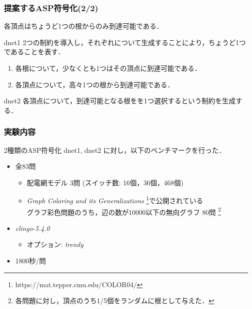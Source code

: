 \documentclass[dvipdfmx,11pt]{beamer}
\begin{document}
\begin{frame}\frametitle{提案するASP符号化(2/2)}
 \begin{exampleblock}{}
  \centering
  各頂点は\alert{ちょうど1つ}の根からのみ到達可能である．
 \end{exampleblock}

 \begin{block}{dnet1}
  2つの制約を導入し，それぞれについて生成することにより，ちょうど1つであることを表す．
   \begin{enumerate}
   \item 各根について，\alert{少なくとも1つ}はその頂点に到達可能である．
   \item 各頂点について，\alert{高々1つ}の根から到達可能である．
   \end{enumerate}
 \end{block}

 \begin{block}{dnet2}
  各頂点について，到達可能となる根をを\alert{1つ選択する}という制約を生成する．
 \end{block}

\end{frame}

\begin{frame}\frametitle{実験内容}
\renewcommand{\thefootnote}{\fnsymbol{footnote}}
\setcounter{footnote}{1}
2種類のASP符号化 dnet1, dnet2 に対し，以下のベンチマークを行った．

\begin{itemize}
 \item {} 全83問
	   \begin{itemize}
		\item 配電網モデル 3問 (スイッチ数: 16個，36個，468個)
		\item \textit{Graph Coloring and its Generalizations}
			  \footnote{https://mat.tepper.cmu.edu/COLOR04/}で公開されている \\
			  グラフ彩色問題のうち，辺の数が10000以下の無向グラフ 80問
			  \footnote{各問題に対し，頂点のうち1/5個をランダムに根として与えた．}
	   \end{itemize}
 \item {} \textit{clingo-5.4.0}
	   \begin{itemize}
		\item オプション: \textit{trendy}
	   \end{itemize}
 \item {} 1800秒/問
\end{itemize}

\end{frame}
\end{document}
